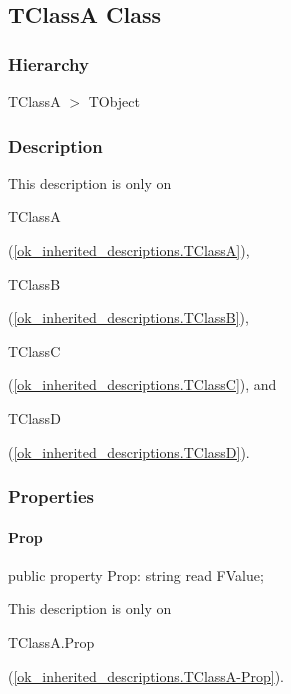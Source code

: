 \documentclass{report}
\begin{document}
\subsection*{TClassA Class}
\subsubsection*{\large{\textbf{Hierarchy}}\normalsize\hspace{1ex}\hfill}
TClassA {$>$} TObject
\subsubsection*{\large{\textbf{Description}}\normalsize\hspace{1ex}\hfill}
This description is only on \begin{ttfamily}TClassA\end{ttfamily}(\ref{ok_inherited_descriptions.TClassA}), \begin{ttfamily}TClassB\end{ttfamily}(\ref{ok_inherited_descriptions.TClassB}), \begin{ttfamily}TClassC\end{ttfamily}(\ref{ok_inherited_descriptions.TClassC}), and \begin{ttfamily}TClassD\end{ttfamily}(\ref{ok_inherited_descriptions.TClassD}).\subsubsection*{\large{\textbf{Properties}}\normalsize\hspace{1ex}\hfill}
\paragraph*{Prop}\hspace*{\fill}

\begin{list}{}{
\setlength{\itemindent}{0cm}
\setlength{\listparindent}{0cm}
\setlength{\leftmargin}{\evensidemargin}
\addtolength{\leftmargin}{\tmplength}
\settowidth{\labelsep}{X}
\addtolength{\leftmargin}{\labelsep}
\setlength{\labelwidth}{\tmplength}
}
\begin{flushleft}
\item[\textbf{Declaration}\hfill]
\begin{ttfamily}
public property Prop: string read FValue;\end{ttfamily}


\end{flushleft}
\par
\item[\textbf{Description}]
This description is only on \begin{ttfamily}TClassA.Prop\end{ttfamily}(\ref{ok_inherited_descriptions.TClassA-Prop}).

\end{list}
\end{document}
